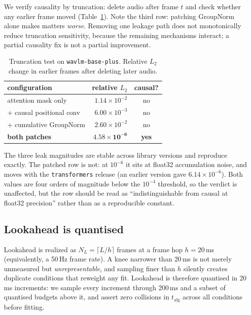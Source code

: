 \documentclass[journal]{IEEEtran}
\begin{document}
We verify causality by truncation: delete audio after frame $t$ and check
whether any earlier frame moved (Table~\ref{tab:causal}). Note the third row:
patching GroupNorm alone makes matters \emph{worse}. Removing one leakage path
does not monotonically reduce truncation sensitivity, because the remaining
mechanisms interact; a partial causality fix is not a partial improvement.

\begin{table}[t]
\centering\footnotesize
\setlength{\tabcolsep}{4pt}
\renewcommand{\arraystretch}{0.93}
\caption{Truncation test on \texttt{wavlm-base-plus}. Relative $L_2$ change in
earlier frames after deleting later audio.}
\label{tab:causal}
\begin{tabular}{lrc}
\toprule
configuration & relative $L_2$ & causal? \\
\midrule
attention mask only        & $1.14\times10^{-2}$ & no \\
\quad + causal positional conv & $6.00\times10^{-3}$ & no \\
\quad + cumulative GroupNorm   & $2.60\times10^{-2}$ & no \\
\textbf{both patches}      & $\mathbf{4.58\times10^{-6}}$ & \textbf{yes} \\
\bottomrule
\end{tabular}
\end{table}

The three leak magnitudes are stable across library versions and reproduce
exactly. The patched row is not: at $10^{-6}$ it sits at float32 accumulation
noise, and moves with the \texttt{transformers} release (an earlier version
gave $6.14\times10^{-6}$). Both values are four orders of magnitude below the
$10^{-4}$ threshold, so the verdict is unaffected, but the row should be
read as ``indistinguishable from causal at float32 precision'' rather than as
a reproducible constant.

\subsection{Lookahead is quantised}
\label{sec:quant}

Lookahead is realized as $N_L=\lceil L/h \rceil$ frames at a frame hop
$h=20$\,ms (equivalently, a 50\,Hz frame rate).
A knee narrower than 20\,ms is not merely unmeasured but
\emph{unrepresentable}, and sampling finer than $h$ silently creates duplicate
conditions that reweight any fit. Lookahead is therefore quantised in 20\,ms increments: we sample every
increment through 200\,ms and a subset of quantised budgets above it, and
assert zero collisions in $t_{\mathrm{alg}}$ across all conditions before
fitting.
\end{document}
